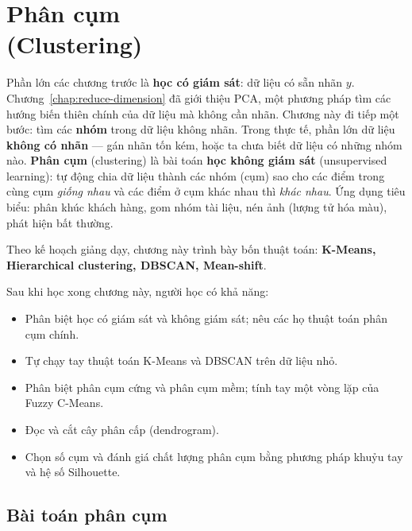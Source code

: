 
\chapter{Phân cụm \\ (Clustering)}
\label{chap:clustering}

Phần lớn các chương trước là \textbf{học có giám sát}: dữ liệu có sẵn nhãn $y$. Chương~\ref{chap:reduce-dimension} đã giới thiệu PCA, một phương pháp tìm các hướng biến thiên chính của dữ liệu mà không cần nhãn. Chương này đi tiếp một bước: tìm các \textbf{nhóm} trong dữ liệu không nhãn. Trong thực tế, phần lớn dữ liệu \textbf{không có nhãn} --- gán nhãn tốn kém, hoặc ta chưa biết dữ liệu có những nhóm nào. \textbf{Phân cụm} (clustering) là bài toán \textbf{học không giám sát} (unsupervised learning): tự động chia dữ liệu thành các nhóm (cụm) sao cho các điểm trong cùng cụm \textit{giống nhau} và các điểm ở cụm khác nhau thì \textit{khác nhau}. Ứng dụng tiêu biểu: phân khúc khách hàng, gom nhóm tài liệu, nén ảnh (lượng tử hóa màu), phát hiện bất thường.

Theo kế hoạch giảng dạy, chương này trình bày bốn thuật toán: \textbf{K-Means, Hierarchical clustering, DBSCAN, Mean-shift}.

\noindent Sau khi học xong chương này, người học có khả năng:
\begin{itemize}
    \item Phân biệt học có giám sát và không giám sát; nêu các họ thuật toán phân cụm chính.
    \item Tự chạy tay thuật toán K-Means và DBSCAN trên dữ liệu nhỏ.
    \item Phân biệt phân cụm cứng và phân cụm mềm; tính tay một vòng lặp của Fuzzy C-Means.
    \item Đọc và cắt cây phân cấp (dendrogram).
    \item Chọn số cụm và đánh giá chất lượng phân cụm bằng phương pháp khuỷu tay và hệ số Silhouette.
\end{itemize}

\section{Bài toán phân cụm}

